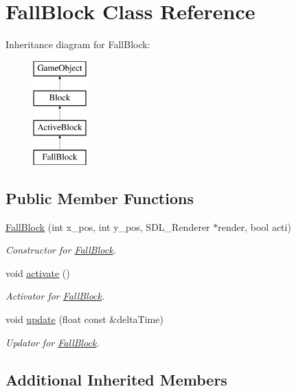 \hypertarget{class_fall_block}{}\section{Fall\+Block Class Reference}
\label{class_fall_block}
Inheritance diagram for Fall\+Block\+:\begin{figure}[H]
\begin{center}
\leavevmode
\includegraphics[height=4.000000cm]{class_fall_block}
\end{center}
\end{figure}
\subsection*{Public Member Functions}
\begin{DoxyCompactItemize}
\item 
\hyperlink{class_fall_block_a1e025d052d33b87556953efdba8ab769}{Fall\+Block} (int x\+\_\+pos, int y\+\_\+pos, S\+D\+L\+\_\+\+Renderer $\ast$render, bool acti)
\begin{DoxyCompactList}\small\item\em Constructor for \hyperlink{class_fall_block}{Fall\+Block}. \end{DoxyCompactList}\item 
void \hyperlink{class_fall_block_aba7d07cfa6d05202e31bc388aff89256}{activate} ()
\begin{DoxyCompactList}\small\item\em Activator for \hyperlink{class_fall_block}{Fall\+Block}. \end{DoxyCompactList}\item 
void \hyperlink{class_fall_block_a91e9a9e851ebf5322200f8136235528b}{update} (float const \&delta\+Time)
\begin{DoxyCompactList}\small\item\em Updator for \hyperlink{class_fall_block}{Fall\+Block}. \end{DoxyCompactList}\end{DoxyCompactItemize}
\subsection*{Additional Inherited Members}


